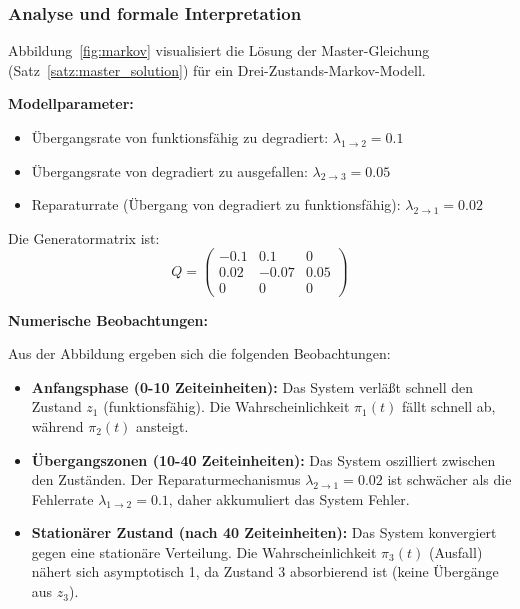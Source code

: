 \documentclass[a4paper,11pt]{article}
\theoremstyle{definition}
\begin{document}
\subsubsection{Analyse und formale Interpretation}

Abbildung~\ref{fig:markov} visualisiert die Lösung der Master-Gleichung 
(Satz~\ref{satz:master_solution}) für ein Drei-Zustands-Markov-Modell.

\textbf{Modellparameter:}
\begin{itemize}
    \item Übergangsrate von funktionsfähig zu degradiert: $\lambda_{1 \to 2} = 0.1$
    \item Übergangsrate von degradiert zu ausgefallen: $\lambda_{2 \to 3} = 0.05$
    \item Reparaturrate (Übergang von degradiert zu funktionsfähig): $\lambda_{2 \to 1} = 0.02$
\end{itemize}

Die Generatormatrix ist:
\[
    Q = \begin{pmatrix}
        -0.1 & 0.1 & 0 \\
        0.02 & -0.07 & 0.05 \\
        0 & 0 & 0
    \end{pmatrix}
\]

\textbf{Numerische Beobachtungen:}

Aus der Abbildung ergeben sich die folgenden Beobachtungen:
\begin{itemize}
    \item \textbf{Anfangsphase (0-10 Zeiteinheiten):} 
          Das System verläßt schnell den Zustand $z_1$ (funktionsfähig). Die Wahrscheinlichkeit 
          $\pi_1(t)$ fällt schnell ab, während $\pi_2(t)$ ansteigt.
    
    \item \textbf{Übergangszonen (10-40 Zeiteinheiten):} 
          Das System oszilliert zwischen den Zuständen. Der Reparaturmechanismus 
          $\lambda_{2 \to 1} = 0.02$ ist schwächer als die Fehlerrate $\lambda_{1 \to 2} = 0.1$, 
          daher akkumuliert das System Fehler.
    
    \item \textbf{Stationärer Zustand (nach 40 Zeiteinheiten):} 
          Das System konvergiert gegen eine stationäre Verteilung. Die Wahrscheinlichkeit 
          $\pi_3(t)$ (Ausfall) nähert sich asymptotisch 1, da Zustand 3 absorbierend ist 
          (keine Übergänge aus $z_3$).
\end{itemize}
\end{document}
